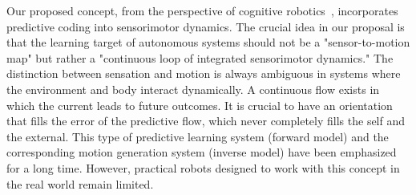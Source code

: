 Our proposed concept, from the perspective of cognitive robotics~\cite{Asada2015}, incorporates predictive coding into sensorimotor dynamics. The crucial idea in our proposal is that the learning target of autonomous systems should not be a "sensor-to-motion map" but rather a "continuous loop of integrated sensorimotor dynamics." The distinction between sensation and motion is always ambiguous in systems where the environment and body interact dynamically. A continuous flow exists in which the current leads to future outcomes. It is crucial to have an orientation that fills the error of the predictive flow, which never completely fills the self and the external. This type of predictive learning system (forward model) and the corresponding motion generation system (inverse model) have been emphasized for a long time. However, practical robots designed to work with this concept in the real world remain limited.



